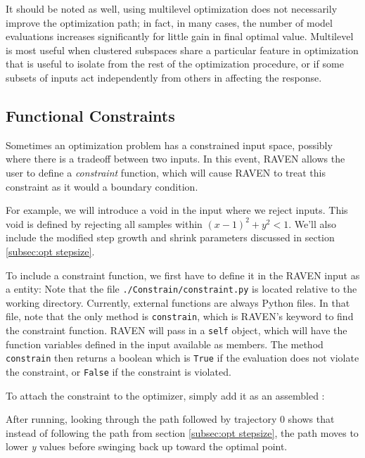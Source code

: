 It should be noted as well, using multilevel optimization does not necessarily improve the optimization path;
in fact, in many cases, the number of model evaluations increases significantly for little gain in final
optimal value.  Multilevel is most useful when clustered subspaces share a particular feature in optimization
that is useful to isolate from the rest of the optimization procedure, or if some subsets of inputs act
independently from others in affecting the response.


\subsection{Functional Constraints} \label{subsec:opt explicit constraint}
Sometimes an optimization problem has a constrained input space, possibly where there is a tradeoff between
two inputs.  In this event, RAVEN allows the user to define a \emph{constraint} function, which will cause
RAVEN to treat this constraint as it would a boundary condition.

For example, we will introduce a void in the input where we reject inputs.  This void is defined by rejecting
all samples within $(x-1)^2 + y^2 < 1$.  We'll also include the modified step growth and shrink parameters
discussed in section \ref{subsec:opt stepsize}.

To include a constraint function, we first have to define it in the RAVEN input as a 
entity:
Note that the file \texttt{./Constrain/constraint.py} is located relative to the working directory.  Currently,
external functions are always Python files.  In that file,
note that the only method is \texttt{constrain}, which is RAVEN's keyword to find the constraint function.
RAVEN will pass in a \texttt{self} object, which will have the function variables defined in the
 input available as members.  The method \texttt{constrain} then returns a boolean which is \texttt{True} if
the evaluation does not violate the constraint, or \texttt{False} if the constraint is violated.

To attach the constraint to the optimizer, simply add it as an assembled :

After running, looking through the path followed by trajectory 0 shows that instead of following the path from
section \ref{subsec:opt stepsize}, the path moves to lower \emph{y} values before swinging back up toward the
optimal point.

